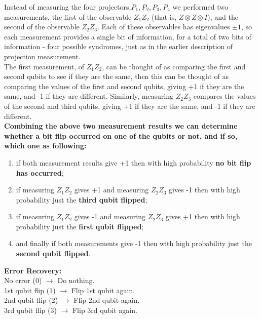 \documentclass[12pt]{report}
\begin{document}
Instead of measuring the four projectors,$P_1,P_2,P_3,P_4$ we performed two measurements, the first of the observable $Z_1Z_2$ (that is, $Z \otimes Z \otimes I$), and the second of the observable $Z_2Z_3$. Each of these observables has eigenvalues $\pm1$, so each measurement provides a single bit of information, for a total of two bits of information - four possible syndromes, just as in the earlier description of projection measurement. \\
The first measurement, of $Z_1Z_2$, can be thought of as comparing the first and second qubits to see if they are the same, then this can be thought of as comparing  the values of the first and second qubits, giving +1 if they are the same, and -1 if they are different. Similarly, measuring $Z_2Z_3$ compares the values of the second and third qubits, giving +1 if they are the same, and -1 if they are different. \\
\textbf{Combining the above two measurement results we can determine whether a bit flip occurred on one of the qubits or not, and if so, which one as following:} 
\begin{enumerate}
\item if both measurement results give +1 then with high probability \textbf{no bit flip has occurred}; 
\item if measuring $Z_1Z_2$ gives +1 and measuring $Z_2Z_3$ gives -1 then with high probability just the \textbf{third qubit flipped}; 
\item if measuring $Z_1Z_2$ gives -1 and measuring $Z_2Z_3$ gives +1 then with high probability just the \textbf{first qubit flipped};
\item and finally if both measurements give -1 then with high probability just the \textbf{second qubit flipped}.
\end{enumerate}
\textbf{Error Recovery:}\\
	 No error (0) $\to$ Do nothing.\\
	1st qubit flip (1) $\to$ Flip 1st qubit again.\\
	2nd qubit flip (2) $\to$ Flip 2nd qubit again.\\
	3rd qubit flip (3) $\to$  Flip 3rd qubit again. \\
\end{document}

